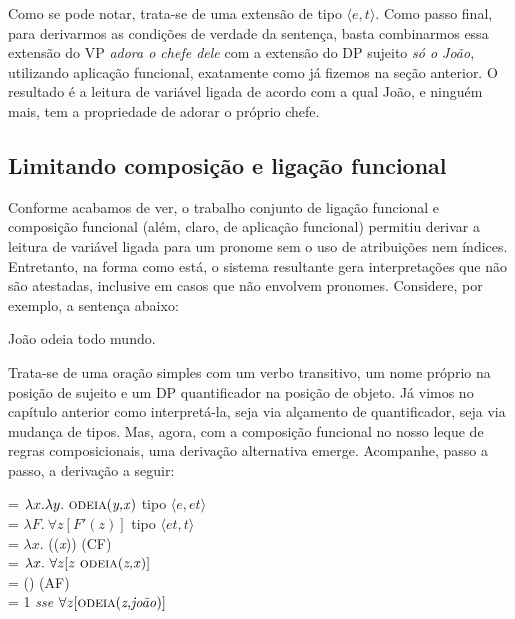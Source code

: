 \n Como se pode notar, trata-se de uma extensão de tipo $\langle e,t\rangle$. Como passo final, para derivarmos as condições de verdade da sentença, basta combinarmos essa extensão do VP \textit{adora o chefe dele} com a extensão do DP sujeito \textit{só o João}, utilizando aplicação funcional, exatamente como já fizemos na seção anterior. O resultado é a leitura de variável ligada de acordo com a qual João, e ninguém mais, tem a propriedade de adorar o próprio chefe.

\subsection{Limitando composição e ligação funcional}

Conforme acabamos de ver, o trabalho conjunto de ligação funcional e composição funcional (além, claro, de aplicação funcional) permitiu derivar a leitura de variável ligada para um pronome sem o uso de atribuições nem índices. Entretanto, na forma como está, o sistema resultante gera interpretações que não são atestadas, inclusive em casos que não envolvem pronomes. Considere, por exemplo, a sentença abaixo:

\begin{exe}
	\ex João odeia todo mundo. \label{err}
\end{exe}

Trata-se de uma oração simples com um verbo transitivo, um nome próprio na posição de sujeito e um DP quantificador na posição de objeto. Já vimos no capítulo anterior como interpretá-la, seja via alçamento de quantificador, seja via mudança de tipos. Mas, agora, com a composição funcional no nosso leque de regras composicionais, uma derivação alternativa emerge. Acompanhe, passo a passo, a derivação a seguir:

\begin{exe}
	\ex {} = $\lambda x. \lambda y.\ \predica{odeia}{y,x}$ \hfill tipo $\langle e,et \rangle$ \\
	 = $\lambda F.\ \forall z [F'(z)]$ \hfill tipo $\langle et,t \rangle$ \\
	 = $\lambda x.$ ((\textit{x})) \hfill (CF) \\
	 = $\lambda x.\ \forall z [z\ \predica{odeia}{z,x}]$ \\
	 = () \hfill (AF) \\
	 = 1 \textit{sse} $\forall z [\text{\textsc{odeia}(\textit{z,joão})}]$
\end{exe}

